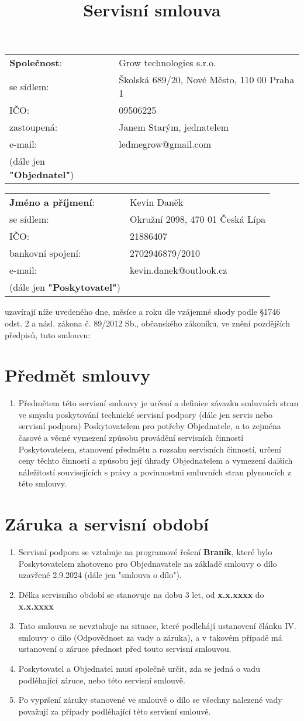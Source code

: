 \documentclass[]{article}
\title{
	{\textbf{Servisní smlouva}}
}
\date{}
\makeatletter
\newcommand{\objednatel}{
	\begin{tabular}{@{}ll@{}}
		\textbf{Společnost}: & Grow technologies s.r.o.\\
		se sídlem: & Školská 689/20, Nové Město, 110 00 Praha 1\\
		IČO: & 09506225\\
		zastoupená: & Janem Starým, jednatelem\\
		e-mail: & ledmegrow@gmail.com \\
		(dále jen \textbf{"Objednatel"})\\
	\end{tabular}
}
\newcommand{\poskytovatel}{
	\begin{tabular}{@{}ll@{}}
		\textbf{Jméno a příjmení}: & Kevin Daněk\\
		se sídlem: & Okružní 2098, 470 01 Česká Lípa\\
		IČO: & 21886407\\
		bankovní spojení: & 2702946879/2010 \\
		e-mail: & kevin.danek@outlook.cz \\
		(dále jen \textbf{"Poskytovatel"})\\
	\end{tabular}
}
\makeatother
\begin{document}
\maketitle

\objednatel

\poskytovatel

uzavírají níže uvedeného dne, měsíce a roku dle vzájemné shody podle §1746 odst. 2 a násl. zákona č. 89/2012 Sb., občanského zákoníku, ve znění pozdějších předpisů, tuto smlouvu:

\section{Předmět smlouvy}

\begin{enumerate}
	\item Předmětem této servisní smlouvy je určení a definice závazku smluvních stran ve smyslu poskytování technické servisní podpory (dále jen servis nebo servisní podpora) Poskytovatelem pro potřeby	Objednatele, a to zejména časové a věcné vymezení způsobu provádění servisních činností Poskytovatelem, stanovení předmětu a rozsahu servisních činností, určení ceny těchto činností a	způsobu její úhrady Objednatelem a vymezení dalších náležitostí souvisejících s právy a povinnostmi smluvních stran plynoucích z této smlouvy.
\end{enumerate}

\section{Záruka a servisní období}
\begin{enumerate}
\item Servisní podpora se vztahuje na programové řešení \textbf{Braník}, které bylo Poskytovatelem zhotoveno pro Objednavatele na základě smlouvy o dílo uzavřené 2.9.2024 (dále jen "smlouva o dílo").
\item Délka servisního období se stanovuje na dobu 3 let, od \textbf{x.x.xxxx} do \textbf{x.x.xxxx}
\item Tato smlouva se nevztahuje na situace, které podlehájí ustanovení článku IV. smlouvy o dílo (Odpovědnost za vady a záruka), a v takovém případě má ustanovení o záruce přednost před touto servisní smlouvou.
\item Poskytovatel a Objednatel musí společně určit, zda se jedná o vadu podléhající záruce, nebo této servisní smlouvě.
\item Po vypršení záruky stanovené ve smlouvě o dílo se všechny nalezené vady považují za případy podléhající této servisní smlouvě.
\end{enumerate}
\end{document}
